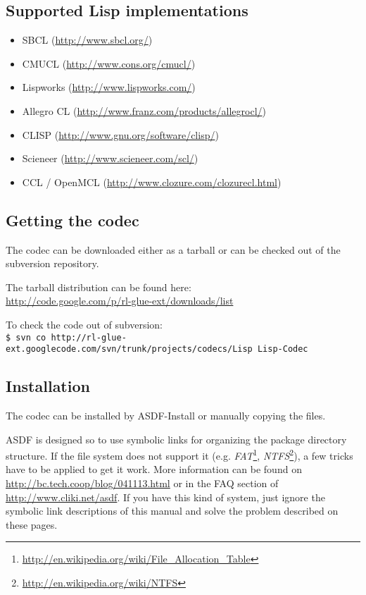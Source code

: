 \documentclass[11pt,a4paper,dvipdfm]{article}
\newcommand{\selfref}[1]{\href{#1}{#1}}
\newcommand{\footref}[2]{\textsl{#1}\footnote{\selfref{#2}}}
\newcommand{\prompttext}[1]{\texttt{#1}}
\newcommand{\shprompt}[1]{\prompttext{\$ #1}}
\begin{document}
\subsection{Supported Lisp implementations}

\begin{itemize}
\item[] SBCL (\selfref{http://www.sbcl.org/})
\item[] CMUCL (\selfref{http://www.cons.org/cmucl/})
\item[] Lispworks (\selfref{http://www.lispworks.com/})
\item[] Allegro CL (\selfref{http://www.franz.com/products/allegrocl/})
\item[] CLISP (\selfref{http://www.gnu.org/software/clisp/})
\item[] Scieneer (\selfref{http://www.scieneer.com/scl/})
\item[] CCL / OpenMCL (\selfref{http://www.clozure.com/clozurecl.html})
\end{itemize}


\subsection{Getting the codec}

The codec can be downloaded either as a tarball or can be checked out of the
subversion repository.

The tarball distribution can be found here: \\
\selfref{http://code.google.com/p/rl-glue-ext/downloads/list}

To check the code out of subversion: \\
\shprompt{svn co
          http://rl-glue-ext.googlecode.com/svn/trunk/projects/codecs/Lisp
          Lisp-Codec}

\subsection{Installation}

The codec can be installed by ASDF-Install or manually copying the files.

ASDF is designed so to use symbolic links for organizing the package directory
structure. If the file system does not support it (e.g.
\footref{FAT}{http://en.wikipedia.org/wiki/File\_Allocation\_Table},
\footref{NTFS}{http://en.wikipedia.org/wiki/NTFS}), a few
tricks have to be applied to get it work. More information can be
found on \selfref{http://bc.tech.coop/blog/041113.html} or in the FAQ section
of \selfref{http://www.cliki.net/asdf}. If you have this kind of system, just
ignore the symbolic link descriptions of this manual and solve the problem
described on these pages.
\end{document}
